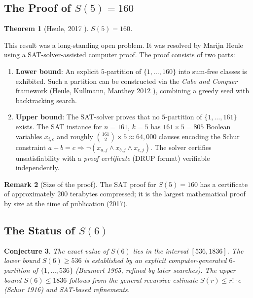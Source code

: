 \documentclass[12pt,a4paper]{amsart}
\newtheorem{theorem}{Theorem}[section]
\newtheorem{conjecture}[theorem]{Conjecture}
\theoremstyle{definition}
\newtheorem{remark}[theorem]{Remark}
\begin{document}
\subsection{The Proof of \texorpdfstring{$S(5) = 160$}{S(5) = 160}}

\begin{theorem}[Heule, 2017 \cite{Heule2017}]\label{thm:s5}
$S(5) = 160$.
\end{theorem}

This result was a long-standing open problem. It was resolved by Marijn Heule using
a SAT-solver-assisted computer proof. The proof consists of two parts:

\begin{enumerate}[label=(\roman*)]
\item \textbf{Lower bound}: An explicit $5$-partition of $\{1,\ldots,160\}$ into
  sum-free classes is exhibited. Such a partition can be constructed via the
  \emph{Cube and Conquer} framework (Heule, Kullmann, Manthey 2012
  \cite{HeuleKullmannManthey2012}), combining a greedy seed with backtracking search.

\item \textbf{Upper bound}: The SAT-solver proves that no $5$-partition of
  $\{1,\ldots,161\}$ exists. The SAT instance for $n = 161$, $k = 5$ has
  $161 \times 5 = 805$ Boolean variables $x_{i,c}$ and roughly $\binom{161}{2} \times 5
  \approx 64{,}000$ clauses encoding the Schur constraint $a + b = c \Rightarrow
  \neg(x_{a,j} \wedge x_{b,j} \wedge x_{c,j})$. The solver certifies unsatisfiability
  with a \emph{proof certificate} (DRUP format) verifiable independently.
\end{enumerate}

\begin{remark}[Size of the proof]
The SAT proof for $S(5) = 160$ has a certificate of approximately $200$ terabytes
compressed; it is the largest mathematical proof by size at the time of publication (2017).
\end{remark}

\subsection{The Status of \texorpdfstring{$S(6)$}{S(6)}}

\begin{conjecture}\label{conj:s6}
The exact value of $S(6)$ lies in the interval $[536, 1836]$. The lower bound
$S(6) \geq 536$ is established by an explicit computer-generated $6$-partition of
$\{1, \ldots, 536\}$ (Baumert 1965, refined by later searches). The upper bound
$S(6) \leq 1836$ follows from the general recursive estimate $S(r) \leq r! \cdot e$
(Schur 1916) and SAT-based refinements.
\end{conjecture}
\end{document}
